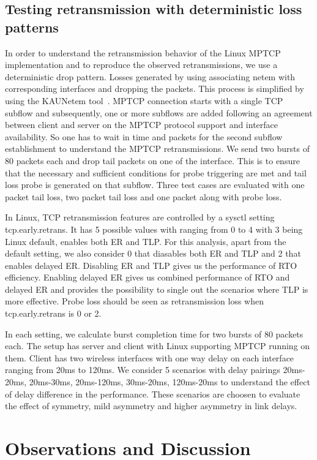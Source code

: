 \documentclass[10pt,draftcls,twocolumn]{IEEEconf}
\begin{document}
\subsection{Testing retransmission with deterministic loss patterns}
In order to understand the retransmission behavior of the Linux MPTCP implementation and to reproduce the observed retransmissions, we use a deterministic drop pattern.
Losses generated by using associating netem with corresponding interfaces and dropping the packets. This process is simplified by using the KAUNetem tool~\cite{Garcia2016}. 
MPTCP connection starts with a single TCP subflow and subsequently, one or more subflows are added following an agreement between client and server on the MPTCP protocol 
support and interface availability. So one has to wait in time and packets for the second subflow establishment to understand the MPTCP retransmissions. We send two bursts of 80 
packets each and drop tail packets on one of the interface. This is to ensure that the necessary and sufficient conditions for probe triggering are met and tail loss probe is generated on that
subflow. Three test cases are evaluated with one packet tail loss, two packet tail loss and  one packet along with probe loss. 

In Linux, TCP retransmission features are controlled by a sysctl setting tcp.early.retrans. It has 5 possible values with ranging from 0 to 4 with 3 being Linux default, enables both
ER and TLP. For this analysis, apart from the default setting, we also consider 0 that diasables both ER and TLP and 2 that enables delayed ER. Disabling ER and TLP gives us the performance
of RTO efficiency. Enabling delayed ER gives us combined performance of RTO and delayed ER and provides the possibility to single out the scenarios where TLP is more effective.
Probe loss should be seen as retransmission loss when tcp.early.retrans is 0 or 2.

In each setting, we calculate burst completion time for two bursts of 80 packets each. The setup has server and client with Linux supporting MPTCP running on them. Client has two wireless 
interfaces with one way delay on each interface ranging from 20ms to 120ms. We consider 5 scenarios with delay pairings 20ms-20ms, 20ms-30ms, 20ms-120ms, 30ms-20ms, 120ms-20ms to understand 
the effect of delay difference in the performance. These scenarios are choosen to evaluate the effect of symmetry, mild asymmetry and higher asymmetry in link delays. 

\section{Observations and Discussion}\label{disc}
\end{document}
